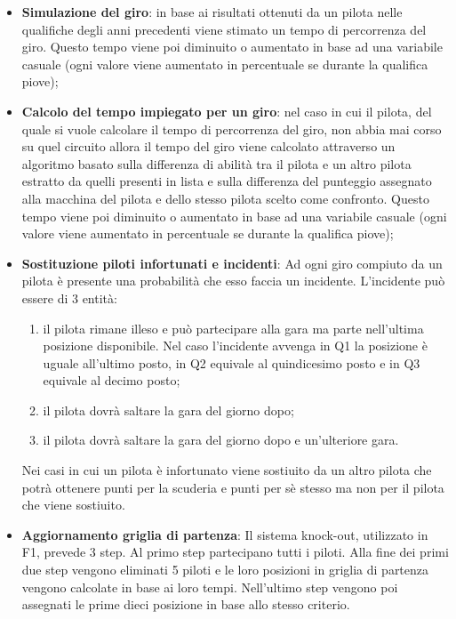 \begin{itemize}

    \item \textbf{Simulazione del giro}: in base ai risultati ottenuti da un pilota nelle qualifiche degli anni precedenti viene stimato un tempo di percorrenza del giro. Questo tempo viene poi diminuito o aumentato in base ad una variabile casuale (ogni valore viene aumentato in percentuale se durante la qualifica piove);
    \item \textbf{Calcolo del tempo impiegato per un giro}: nel caso in cui il pilota, del quale si vuole calcolare il tempo di percorrenza del giro, non abbia mai corso su quel circuito allora il tempo del giro viene calcolato attraverso un algoritmo basato sulla differenza di abilità tra il pilota e un altro pilota estratto da quelli presenti in lista e sulla differenza del punteggio assegnato alla macchina del pilota e dello stesso pilota scelto come confronto. Questo tempo viene poi diminuito o aumentato in base ad una variabile casuale (ogni valore viene aumentato in percentuale se durante la qualifica piove);
    \item \textbf{Sostituzione piloti infortunati e incidenti}: Ad ogni giro compiuto da un pilota è presente una probabilità che esso faccia un incidente. L'incidente può essere di 3 entità: 
    \begin{enumerate}
    \item il pilota rimane illeso e può partecipare alla gara ma parte nell'ultima posizione disponibile. Nel caso l'incidente avvenga in Q1 la posizione è uguale all'ultimo posto, in Q2 equivale al quindicesimo posto e in Q3 equivale al decimo posto;
    \item il pilota dovrà saltare la gara del giorno dopo;
    \item il pilota dovrà saltare la gara del giorno dopo e un'ulteriore gara.
    \end{enumerate}
    Nei casi in cui un pilota è infortunato viene sostiuito da un altro pilota che potrà ottenere punti per la scuderia e punti per sè stesso ma non per il pilota che viene sostiuito.
    \item \textbf{Aggiornamento griglia di partenza}: Il sistema knock-out, utilizzato in F1, prevede 3 step. Al primo step partecipano tutti i piloti. Alla fine dei primi due step vengono eliminati 5 piloti e le loro posizioni in griglia di partenza vengono calcolate in base ai loro tempi. Nell'ultimo step vengono poi assegnati le prime dieci posizione in base allo stesso criterio.
\end{itemize}
